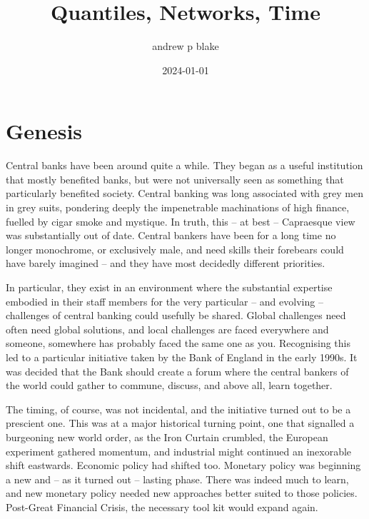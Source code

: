 \documentclass[
  letterpaper,
]{book}
\title{Quantiles, Networks, Time}
\author{andrew p blake}
\date{2024-01-01}
\renewcommand*\contentsname{Table of contents}
\newcommand\contentsname{Table of contents}
\begin{document}
\frontmatter
\maketitle
\ifdefined\Shaded\renewenvironment{Shaded}{\begin{tcolorbox}[boxrule=0pt, interior hidden, enhanced, breakable, frame hidden, borderline west={3pt}{0pt}{shadecolor}, sharp corners]}{\end{tcolorbox}}\fi

\renewcommand*\contentsname{Table of contents}
{
\setcounter{tocdepth}{2}
\tableofcontents
}
\listoffigures
\listoftables
\mainmatter
{}

\hypertarget{sec-genesis}{%
\chapter*{Genesis}\label{sec-genesis}}


Central banks have been around quite a while. They began as a useful
institution that mostly benefited banks, but were not universally seen
as something that particularly benefited society. Central banking was
long associated with grey men in grey suits, pondering deeply the
impenetrable machinations of high finance, fuelled by cigar smoke and
mystique. In truth, this -- at best -- Capraesque view was substantially
out of date. Central bankers have been for a long time no longer
monochrome, or exclusively male, and need skills their forebears could
have barely imagined -- and they have most decidedly different
priorities.

In particular, they exist in an environment where the substantial
expertise embodied in their staff members for the very particular -- and
evolving -- challenges of central banking could usefully be shared.
Global challenges need often need global solutions, and local challenges
are faced everywhere and someone, somewhere has probably faced the same
one as you. Recognising this led to a particular initiative taken by the
Bank of England in the early 1990s. It was decided that the Bank should
create a forum where the central bankers of the world could gather to
commune, discuss, and above all, learn together.

The timing, of course, was not incidental, and the initiative turned out
to be a prescient one. This was at a major historical turning point, one
that signalled a burgeoning new world order, as the Iron Curtain
crumbled, the European experiment gathered momentum, and industrial
might continued an inexorable shift eastwards. Economic policy had
shifted too. Monetary policy was beginning a new and -- as it turned out
-- lasting phase. There was indeed much to learn, and new monetary
policy needed new approaches better suited to those policies. Post-Great
Financial Crisis, the necessary tool kit would expand again.
\end{document}
